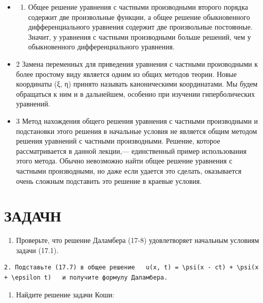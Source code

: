 \documentclass[
  ukrainian,
]{article}
\providecommand{\tightlist}{%
  \setlength{\itemsep}{0pt}\setlength{\parskip}{0pt}}
\begin{document}
\begin{itemize}
\item
  \begin{enumerate}
  \def\labelenumi{\arabic{enumi}.}
  \tightlist
  \item
    Общее решение уравнения с частными производными второго порядка
    содержит две произвольные функции, а общее решение обыкновенного
    дифференциального уравнения содержит две произвольные постоянные.
    Значит, у уравнения с частными производными больше решений, чем у
    обыкновенного дифференциального уравнения.
  \end{enumerate}
\item
  2 Замена переменных для приведения уравнения с частными производными к
  более простому виду является одним из общих методов теории. Новые
  координаты (ξ, η) принято называть каноническими координатами. Мы
  будем обращаться к ним и в дальнейшем, особенно при изучении
  гиперболических уравнений.
\item
  3 Метод нахождения общего решения уравнения с частными производными и
  подстановки этого решения в начальные условия не является общим
  методом решения уравнений с частными производными. Решение, которое
  рассматривается в данной лекции,--- единственный пример использования
  этого метода. Обычно невозможно найти общее решение уравнения с
  частными производными, но даже если удается это сделать, оказывается
  очень сложным подставить это решение в краевые условия.
\end{itemize}

\section{ЗАДАЧН}\label{ux437ux430ux434ux430ux447ux43d}

\begin{enumerate}
\def\labelenumi{\arabic{enumi}.}
\tightlist
\item
  Проверьте, что решение Даламбера (17-8) удовлетворяет начальным
  условиям задачи (17.1).
\end{enumerate}

\begin{verbatim}
2. Подставьте (17.7) в общее решение   u(x, t) = \psi(x - ct) + \psi(x + \epsilon t)   и получите формулу Даламбера.
\end{verbatim}

\begin{enumerate}
\def\labelenumi{\arabic{enumi}.}
\setcounter{enumi}{2}
\tightlist
\item
  Найдите решение задачи Коши:
\end{enumerate}
\end{document}
